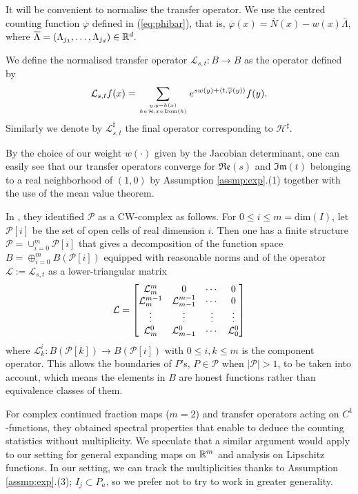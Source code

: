 \documentclass[12pt,a4paper,reqno]{amsart}
\begin{document}
It will be convenient to normalise the transfer operator. We use the centred  counting function $\overline{\varphi }$ defined in (\ref{eq:phibar}), that is, $\overline{\varphi}(x) = \overline{N}(x) - w(x)\overline{\Lambda}$, where $\overline{\Lambda} = (\Lambda_{j_1}, \ldots, \Lambda_{j_d}) \in {\mathbb R}^d.$
\begin{definition}\label{def:normalised}
We define  the normalised transfer operator $\mathcal{L}_{s,t} : B \to B$ as  the operator defined by
\[
\mathcal{L}_{s,t}f(x) = \sum_{y : y = h(x) \atop h \in \mathcal{H}, x \in \mathrm{Dom}(h)} e^{s w(y)+ \langle t, \overline{\varphi}(y) \rangle} f(y).
\]
Similarly we denote by $\mathcal{L}_{s,t}^\sharp$ the final operator corresponding to $\mathcal{H}^\sharp$.
\end{definition}

By the choice of our weight $w(\cdot)$ given by the Jacobian determinant, one can easily see that our transfer operators converge for $\mathfrak{Re}(s)$ and $\mathfrak{Im}(t)$ belonging to a real neighborhood  of $(1,0)$
by Assumption \ref{assmp:exp}.(1) together with the use of the mean value theorem.


\begin{remark} \label{rmk:cell}
In \cite{kim2025}, they identified $\mathcal{P}$ as a CW-complex as follows. For $0 \leq i \leq m=\mathrm{dim}(I)$, let $\mathcal{P}[i]$ be the set of open cells of real dimension $i$. Then one has a finite structure $\mathcal{P}=\cup_{i=0}^m \mathcal{P}[i]$ that gives a  decomposition of the function space $B=\oplus_{i=0}^m B(\mathcal{P}[i])$ equipped with  reasonable norms and of the operator $\mathcal{L}:=\mathcal{L}_{s,t}$ as a lower-triangular matrix 
\[  {\mathcal L} = \begin{bmatrix}
{\mathcal L}_m^m & 0 & \cdots & 0  \\
{\mathcal L}_m^{m-1} & {\mathcal L}_{m-1}^{m-1} & \cdots &0  \\
\vdots & \vdots & \vdots & \vdots  \\
{\mathcal L}_m^0 & {\mathcal L}_{m-1}^0 & \cdots  & {\mathcal L}_0^0 
\end{bmatrix} \]
where $\mathcal{L}^i_k: B(\mathcal{P}[k]) \rightarrow B(\mathcal{P}[i])$ with $0 \leq i,k \leq m$ is the component operator.  This allows the boundaries of $P$'s, $P \in \mathcal{P}$ when $|\mathcal{P}|>1$, to be taken into account, which means the elements in $B$ are honest functions rather than equivalence classes of them. 

For complex continued fraction maps ($m=2$) and transfer operators acting on $C^1$-functions, they obtained spectral properties that enable to deduce the counting statistics without multiplicity. We speculate that a similar argument would apply to our setting for general expanding maps on ${\mathbb R}^m$ and analysis on Lipschitz functions. In our setting, we can track the multiplicities thanks to Assumption \ref{assmp:exp}.(3); $I_j \subset P_a$, so we prefer not to try to work in greater generality.
 \end{remark}
\end{document}

